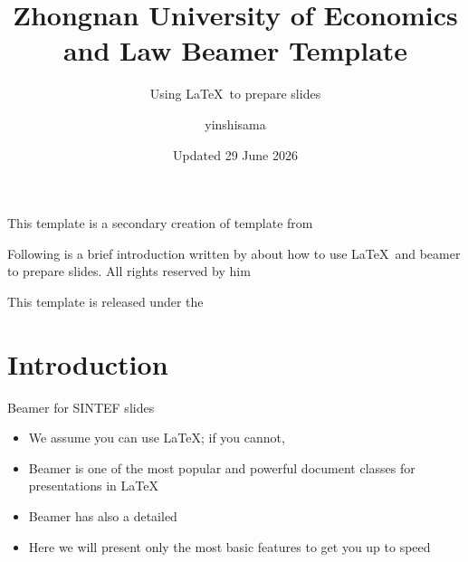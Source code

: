 \documentclass{beamer}
\title{Zhongnan University of Economics and Law Beamer Template}
\subtitle{Using \LaTeX\ to prepare slides}
\author{yinshisama}
\date{Updated 29 June 2026}
\begin{document}
\maketitle

\begin{frame}
    This template is a secondary creation of  template from  \vspace{\baselineskip}

    Following is a brief introduction written by  about how to use \LaTeX\ and beamer to prepare slides. All rights reserved by him\vspace{\baselineskip}

    This template is released under the 
\end{frame}

\section{Introduction}

\begin{frame}{Beamer for SINTEF slides}
    \begin{itemize}
        \item We assume you can use \LaTeX; if you cannot, 
        \item Beamer is one of the most popular and powerful document classes for presentations in \LaTeX
        \item Beamer has also a detailed 
        \item Here we will present only the most basic features to get you up to speed
    \end{itemize}
\end{frame}
\end{document}
